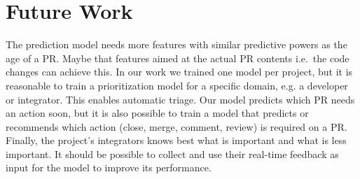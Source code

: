 \section{Future Work}
\label{sec:future}

The prediction model needs more features with similar predictive powers as the age of a PR.
Maybe that features aimed at the actual PR contents i.e.\ the code changes can achieve this.
In our work we trained one model per project, but it is reasonable to train a prioritization model for a specific domain, e.g. a developer or integrator.
This enables automatic triage.
Our model predicts which PR needs an action soon, but it is also possible to train a model that predicts or recommends which action (close, merge, comment, review) is required on a PR.
Finally, the project's integrators knows best what is important and what is less important.
It should be possible to collect and use their real-time feedback as input for the model to improve its performance.
